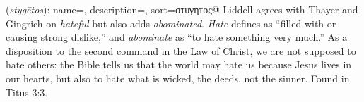 \item[Hateful,]

(\textit{stygētos}):
{
    name=,
    description={},
    sort=στυγητος@
}
Liddell agrees with Thayer and Gingrich on \emph{hateful} but also adds \emph{abominated}. \emph{Hate} defines as ``filled with or causing strong dislike,'' and \emph{abominate} as ``to hate something very much.'' As a disposition to the second command in the Law of Christ, we are not supposed to hate others: the Bible tells us that the world may hate us because Jesus lives in our hearts, but also to hate what is wicked, the deeds, not the sinner.
Found in Titus 3:3.
